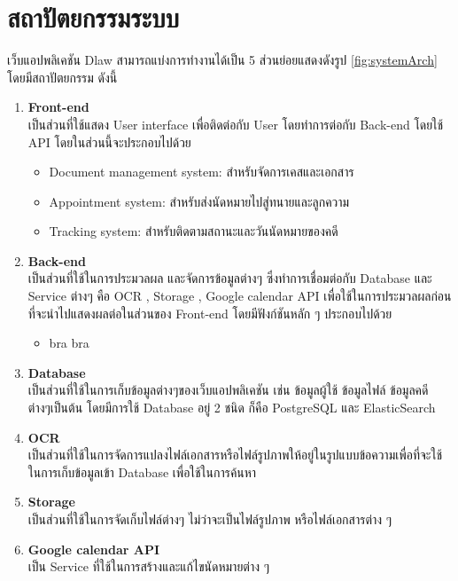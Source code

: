\documentclass[12pt,oneside,openright,a4paper]{cpe-thai-project}
\begin{document}
\section{สถาปัตยกรรมระบบ}
\hspace*{1cm} เว็บแอปพลิเคชัน Dlaw สามารถแบ่งการทำงานได้เป็น 5 ส่วนย่อยแสดงดังรูป \ref{fig:systemArch} โดยมีสถาปัตยกรรม ดังนี้
\begin{enumerate}
  \item \textbf{Front-end} \\
  \hspace*{1cm} เป็นส่วนที่ใช้แสดง User interface เพื่อติดต่อกับ User โดยทำการต่อกับ Back-end โดยใช้ API โดยในส่วนนี้จะประกอบไปด้วย
  \begin{itemize}
    \item Document management system: สำหรับจัดการเคสและเอกสาร
    \item Appointment system: สำหรับส่งนัดหมายไปสู่ทนายและลูกความ
    \item Tracking system: สำหรับติดตามสถานะและวันนัดหมายของคดี
  \end{itemize}
  \item \textbf{Back-end} \\
  \hspace*{1cm} เป็นส่วนที่ใช้ในการประมวลผล และจัดการข้อมูลต่างๆ ซึ่งทำการเชื่อมต่อกับ Database และ Service ต่างๆ คือ OCR , Storage , Google calendar API เพื่อใช้ในการประมวลผลก่อนที่จะนำไปแสดงผลต่อในส่วนของ Front-end โดยมีฟังก์ชันหลัก ๆ ประกอบไปด้วย
  \begin{itemize}
    \item bra bra
  \end{itemize}
  \item \textbf{Database} \\
  \hspace*{1cm} เป็นส่วนที่ใช้ในการเก็บข้อมูลต่างๆของเว็บแอปพลิเคชัน เช่น ข้อมูลผู้ใช้ ข้อมูลไฟล์ ข้อมูลคดี ต่างๆเป็นต้น โดยมีการใช้ Database อยู่ 2 ชนิด ก็คือ PostgreSQL และ ElasticSearch 
  \item \textbf{OCR} \\
  \hspace*{1cm} เป็นส่วนที่ใช้ในการจัดการแปลงไฟล์เอกสารหรือไฟล์รูปภาพให้อยู่ในรูปแบบข้อความเพื่อที่จะใช้ในการเก็บข้อมูลเข้า Database เพื่อใช้ในการค้นหา
  \item \textbf{Storage} \\
  \hspace*{1cm} เป็นส่วนที่ใช้ในการจัดเก็บไฟล์ต่างๆ ไม่ว่าจะเป็นไฟล์รูปภาพ หรือไฟล์เอกสารต่าง ๆ 
  \item \textbf{Google calendar API} \\
  \hspace*{1cm} เป็น Service ที่ใช้ในการสร้างและแก้ไขนัดหมายต่าง ๆ
\end{enumerate}
\end{document}
